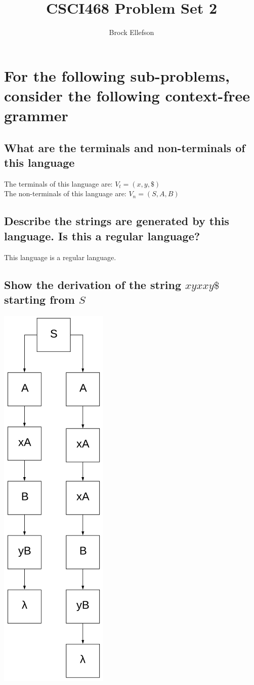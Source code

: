 \documentclass[10pt,a4paper]{article}
\author{Brock Ellefson}
\title{CSCI468 Problem Set 2}
\begin{document}
\maketitle
\section{For the following sub-problems, consider the following context-free grammer}
\subsection{What are the terminals and non-terminals of this language}
The terminals of this language are: $V_{t} = (x , y, \$)$ \\
The non-terminals of this language are: $V_{n} = (S, A, B)$

\subsection{Describe the strings are generated by this language. Is this a regular language?}
This language is a regular language.

\subsection{Show the derivation of the string $xyxxy\$$ starting from $S$}
\includegraphics[scale=.5]{parsetree.png}
\end{document}
